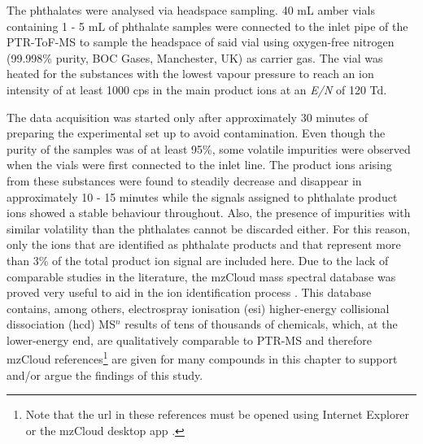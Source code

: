 
The phthalates were analysed via headspace sampling. 
%
40 mL amber vials containing 1 - 5 mL of  phthalate samples were connected to the inlet pipe of the PTR-ToF-MS to sample the headspace of said vial using oxygen-free nitrogen (99.998\% purity, BOC Gases, Manchester, UK) as carrier gas.
%
The vial was heated for the substances with the lowest vapour pressure  %
to reach an ion intensity of at least 1000 %
 cps in the main product ions  at an \textit{E/N} of 120 Td.
%



The data acquisition was started only after approximately 30 minutes of preparing the experimental set up to avoid contamination.
%
Even though the purity of the samples was of at least 95\%, some volatile impurities were observed when the vials were first connected to the inlet line.
%
The product ions arising from these substances were found to steadily decrease and disappear in approximately 10 - 15 minutes while the signals assigned to  phthalate product ions showed a stable behaviour throughout.
%
Also, the presence of impurities with similar volatility than the phthalates cannot be discarded either. 
%
For this reason, only the  ions that are identified as phthalate products and that represent more than 3\% of the total product ion signal are included here.
%
Due to the lack of comparable studies in the literature, the mzCloud mass spectral database was proved very useful to aid in the ion identification process \cite{mzcloudd}.
%
 This database contains, among others, electrospray ionisation (\acrshort{esi})  higher-energy collisional dissociation (\acrshort{hcd})  MS$^n$ results of tens of thousands of chemicals, which, at the lower-energy end,  are qualitatively comparable to PTR-MS and therefore mzCloud references\footnote{Note that the url in these references must be opened using Internet Explorer or the mzCloud desktop app \cite{mzcloudd}.}  are given for many compounds in this chapter to support and/or argue the findings of this study.
 



